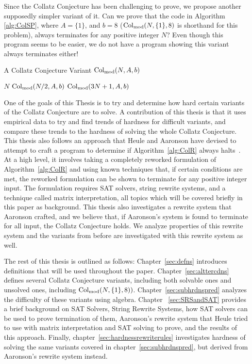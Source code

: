 Since the Collatz Conjecture has been challenging to prove, we propose another supposedly simpler variant of it. Can we prove that the code in Algorithm \ref{alg:ColSP}, where $A = \{1\}$, and $b = 8$ ($\mathrm{Col}_{\text{mod}}(N,\{1\},8)$ is shorthand for this problem), always terminates for any positive integer $N$? Even though this program seems to be easier, we do not have a program showing this variant always terminates either! \par
\begin{algorithm} 
\caption{A Collatz Conjecture Variant $\mathrm{Col}_{\text{mod}}(N,A,b)$}
\label{alg:ColSP} 
\begin{algorithmic}[1]
     \Return $N$
    \EndIf
     \Return $\mathrm{Col}_{\text{mod}}(N/2,A,b)$
    \EndIf
    \State \Return $\mathrm{Col}_{\text{mod}}(3N+1,A,b)$ 
\end{algorithmic}
\end{algorithm}
One of the goals of this Thesis is to try and determine how hard certain variants of the Collatz Conjecture are to solve. A contribution of this thesis is that it uses empirical data to try and find trends of hardness for difficult variants, and compare these trends to the hardness of solving the whole Collatz Conjecture. This thesis also follows an approach that Heule and Aaronson have devised to attempt to craft a program to determine if Algorithm~\ref{alg:ColR} always halts~\cite{HeuleAaronson}. At a high level, it involves taking a completely reworked formulation of Algorithm~\ref{alg:ColR} and using known techniques that, if certain conditions are met, the reworked formulation can be shown to terminate for any positive integer input. The formulation requires SAT solvers, string rewrite systems, and a technique called matrix interpretation, all topics which will be covered briefly in this paper as background. This thesis also investigates a rewrite system that Aaronson crafted, and we believe that, if Aaronson's system is found to terminate for all input, the Collatz Conjecture holds. We analyze properties of this rewrite system and the variants from before are investigated with this rewrite system as well.\par
The rest of this thesis is outlined as follows: Chapter~\ref{sec:defns} introduces definitions that will be used throughout the paper. Chapter~\ref{sec:alttercdns} defines several Collatz Conjecture variants, including both solvable ones and unsolved ones, including $\mathrm{Col}_{\text{mod}}(N,\{1\},8))$. Chapter~\ref{sec:subhrdnspred} analyzes the difficulty of these variants using algebra. Chapter ~\ref{sec:SRSandSAT} provides a brief background on SAT Solvers, String Rewrite Systems, how SAT solvers can be used to prove termination of them, Aaronson's rewrite system that Heule tried to use with matrix interpretation and SAT solving to prove, and the results of this approach. Finally, chapter~\ref{sec:hardnessrewriterules} investigates hardness of solving the same variants covered in chapter~\ref{sec:subhrdnspred}, but derived from Aaronson's rewrite system instead.